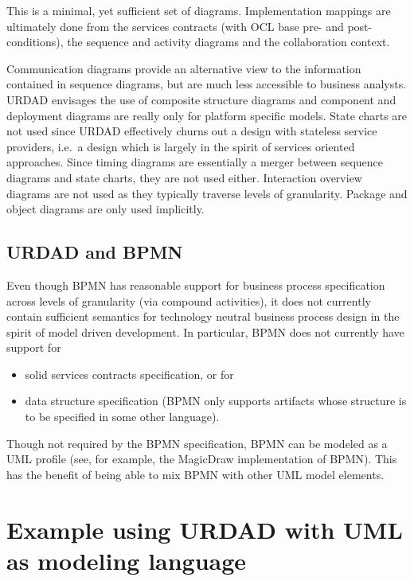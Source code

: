 \documentclass{IOS-Book-Article}
\begin{document}
This is a minimal, yet sufficient set of diagrams. Implementation mappings are ultimately done from the services contracts (with OCL
base pre- and post-conditions), the sequence and activity diagrams and the collaboration
context.

Communication diagrams provide an alternative view to the information contained in sequence diagrams, but are much less accessible to business analysts.
URDAD envisages the use of composite structure diagrams and component and deployment diagrams are really only for platform specific models. State charts are not used since URDAD effectively churns out a design with stateless service providers, i.e.\ a design which is largely in the spirit of services oriented approaches. Since timing diagrams are essentially a merger between
sequence diagrams and state charts, they are not used either. Interaction overview diagrams are not used as they typically traverse levels of granularity. Package and object diagrams are only
used implicitly.


\subsection{URDAD and BPMN}

Even though BPMN has reasonable support for business process specification
across levels of granularity (via compound activities), it does not currently
contain sufficient semantics for technology neutral business process design in
the spirit of model driven development. In particular, BPMN does not currently
have support for

\begin{itemize}
  \item solid services contracts specification, or for

  \item data structure specification (BPMN only supports artifacts whose
	structure is to be specified in some other language).
\end{itemize}

Though not required by the BPMN specification, BPMN can be modeled as a UML profile
(see, for example, the MagicDraw implementation of BPMN).
This has the benefit of being able to mix BPMN with other UML model elements.


\section{Example using URDAD with UML as modeling language}
\end{document}

